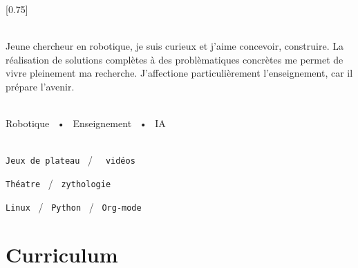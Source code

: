 \documentclass[pastel]{simplehipstercv}
\begin{document}
\setlength{\columnsep}{1.5cm}
[0.75]
\begin{paracol}{2}

\paracolbackgroundoptions



\footnotesize
{\setasidefontcolour
\flushright
\begin{center}
\end{center}

\\[0.5em]

{\footnotesize
Jeune chercheur en robotique, je suis curieux et j'aime concevoir, construire. La réalisation de solutions complètes à des problèmatiques concrètes me permet de vivre pleinement ma recherche. J'affectione particulièrement l'enseignement, car il prépare l'avenir.}
\bigskip

\bigskip

 \\[0.5em]

Robotique ~•~ Enseignement ~•~ IA

\bigskip



\bigskip


\\[0.5em]

\texttt{Jeux de plateau} ~/~ \texttt{ vidéos}

\texttt{Théatre} ~/~ \texttt{zythologie}

\texttt{Linux} ~/~ \texttt{Python} ~/~ \texttt{Org-mode}

\vspace{4em}


\phantom{turn the page}

\phantom{turn the page}
}
\switchcolumn

\small
\section*{Curriculum}


\end{paracol}
\end{document}
